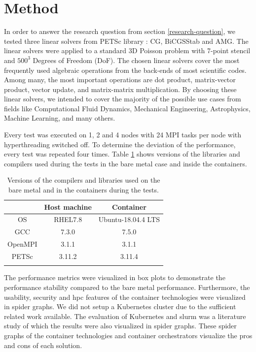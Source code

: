 \documentclass[12pt]{article}
\begin{document}
\section{Method}
In order to answer the research question from section \ref{research-question}, we tested three linear solvers from PETSc library \cite{PETSc2020overview}: CG, BiCGSStab and AMG. The linear solvers were applied to a standard 3D Poisson problem with 7-point stencil and $500^3$ Degrees of Freedom (DoF). The chosen linear solvers cover the most frequently used algebraic operations from the back-ends of most scientific codes. Among many, the most important operations are dot product, matrix-vector product, vector update, and matrix-matrix multiplication. By choosing these linear solvers, we intended to cover the majority of the possible use cases from fields like Computational Fluid Dynamics, Mechanical Engineering, Astrophysics, Machine Learning, and many others.

Every test was executed on 1, 2 and 4 nodes with 24 MPI tasks per node with hyperthreading switched off. To determine the deviation of the performance, every test was repeated four times. Table \ref{tab:lib_verions} shows versions of the libraries and compilers used during the tests in the bare metal case and inside the containers.
\begin{table}[H]
    \centering
    \begin{tabular}{c c c}
        \hline
                & Host machine & Container \\ \hline
        OS      & RHEL7.8      & Ubuntu-18.04.4 LTS \\
        GCC     & 7.3.0        & 7.5.0 \\
        OpenMPI & 3.1.1        & 3.1.1 \\
        PETSc   & 3.11.2       & 3.11.4 \\ \\
    \end{tabular}
    \caption{Versions of the compilers and libraries used on the bare metal and in the containers during the tests.}
    \label{tab:lib_verions}
\end{table}

The performance metrics were visualized in box plots to demonstrate the performance stability compared to the bare metal performance. Furthermore, the usability, security and \gls{hpc} features of the container technologies were visualized in spider graphs. We did not setup a Kubernetes cluster due to the sufficient related work available. The evaluation of Kubernetes and \gls{slurm} was a literature study of which the results were also visualized in spider graphs. These spider graphs of the container technologies and container orchestrators visualize the pros and cons of each solution. 
\end{document}
